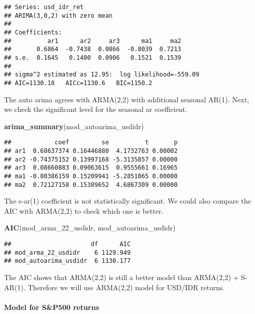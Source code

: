 \documentclass[]{article}
\newenvironment{Shaded}{\begin{snugshade}}{\end{snugshade}}
\newcommand{\KeywordTok}[1]{\textcolor[rgb]{0.13,0.29,0.53}{\textbf{#1}}}
\newcommand{\NormalTok}[1]{#1}
\let\oldparagraph\paragraph
\renewcommand{\paragraph}[1]{\oldparagraph{#1}\mbox{}}
\begin{document}
\begin{verbatim}
## Series: usd_idr_ret 
## ARIMA(3,0,2) with zero mean 
## 
## Coefficients:
##          ar1      ar2     ar3      ma1     ma2
##       0.6864  -0.7438  0.0866  -0.8039  0.7213
## s.e.  0.1645   0.1400  0.0906   0.1521  0.1539
## 
## sigma^2 estimated as 12.95:  log likelihood=-559.09
## AIC=1130.18   AICc=1130.6   BIC=1150.2
\end{verbatim}

The auto arima agrees with ARMA(2,2) with additional seasonal AR(1).
Next, we check the significant level for the seasonal ar coefficient.

\begin{Shaded}
\begin{Highlighting}[]
\KeywordTok{arima_summary}\NormalTok{(mod_autoarima_usdidr)}
\end{Highlighting}
\end{Shaded}

\begin{verbatim}
##            coef         se          t       p
## ar1  0.68637374 0.16446880  4.1732763 0.00002
## ar2 -0.74375152 0.13997168 -5.3135857 0.00000
## ar3  0.08660883 0.09063615  0.9555661 0.16965
## ma1 -0.80386159 0.15209941 -5.2851065 0.00000
## ma2  0.72127158 0.15389652  4.6867309 0.00000
\end{verbatim}

The s-ar(1) coefficient is not statistically significant. We could also
compare the AIC with ARMA(2,2) to check which one is better.

\begin{Shaded}
\begin{Highlighting}[]
\KeywordTok{AIC}\NormalTok{(mod_arma_22_usdidr, mod_autoarima_usdidr)}
\end{Highlighting}
\end{Shaded}

\begin{verbatim}
##                      df      AIC
## mod_arma_22_usdidr    6 1129.949
## mod_autoarima_usdidr  6 1130.177
\end{verbatim}

The AIC shows that ARMA(2,2) is still a better model than ARMA(2,2) +
S-AR(1). Therefore we will use ARMA(2,2) model for USD/IDR returns.

\paragraph{Model for S\&P500 returns}\label{model-for-sp500-returns}
\end{document}

